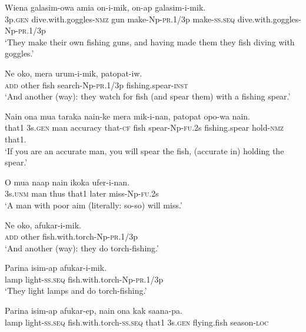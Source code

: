 \ea\label{ex:a:x33}
\gll  Wiena  galasim-owa  amia  on-i-mik,           on-ap  galasim-i-mik. \\
3p.\textsc{gen}  dive.with.goggles-\textsc{nmz}  gun  make-Np-\textsc{pr}.1/3p make-\textsc{ss.seq}  dive.with.goggles-Np-\textsc{pr}.1/3p \\


\glt ‘They make their own fishing guns, and having made them they fish diving with goggles.’ \\
\z


\ea\label{ex:a:x34}
\gll  Ne  oko,  mera  urum-i-mik,  patopat-iw. \\
\textsc{add}  other  fish  search-Np-\textsc{pr}.1/3p  fishing.spear-\textsc{inst} \\
\glt ‘And another (way): they watch for fish (and spear them) with a fishing spear.’ \\
\z


\ea\label{ex:a:x35}
\gll  Nain  ona  mua  taraka  nain-ke  mera  mik-i-nan,       patopat  opo-wa  nain. \\
that1  3s.\textsc{gen}  man  accuracy  that-\textsc{cf}  fish  spear-Np-\textsc{fu}.2s   fishing.spear  hold-\textsc{nmz}  that1. \\


\glt ‘If you are an accurate man, you will spear the fish, (accurate in) holding the spear.’ \\
\z


\ea\label{ex:a:x36}
\gll  O  mua  naap  nain  ikoka  ufer-i-nan. \\
3s.\textsc{unm}  man  thus  that1  later  miss-Np-\textsc{fu}.2s \\
\glt ‘A man with poor aim (literally: so-so) will miss.’ \\
\z


\ea\label{ex:a:x37}
\gll  Ne  oko,  afukar-i-mik. \\
\textsc{add}  other  fish.with.torch-Np-\textsc{pr}.1/3p \\
\glt ‘And another (way): they do torch-fishing.’ \\
\z


\ea\label{ex:a:x38}
\gll  Parina  isim-ap  afukar-i-mik. \\
lamp  light-\textsc{ss.seq}  fish.with.torch-Np-\textsc{pr}.1/3p \\
\glt ‘They light lamps and do torch-fishing.’ \\
\z


\ea\label{ex:a:x39}
\gll  Parina  isim-ap  afukar-ep,  nain            ona  kak  saana-pa. \\
lamp  light-\textsc{ss.seq}  fish.with.torch-\textsc{ss.seq}  that1  3s.\textsc{gen}  flying.fish  season-\textsc{loc} \\


